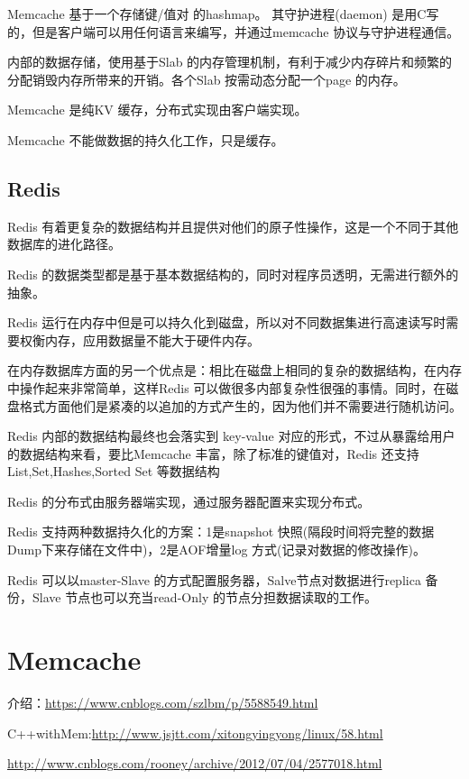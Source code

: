 \documentclass[UTF8,a4paper,12pt]{ctexbook}
\begin{document}
			Memcache 基于一个存储键/值对 的hashmap。 其守护进程(daemon) 是用C写的，但是客户端可以用任何语言来编写，并通过memcache 协议与守护进程通信。
			
			内部的数据存储，使用基于Slab 的内存管理机制，有利于减少内存碎片和频繁的分配销毁内存所带来的开销。各个Slab 按需动态分配一个page 的内存。
			 
			Memcache 是纯KV 缓存，分布式实现由客户端实现。
			
			Memcache 不能做数据的持久化工作，只是缓存。
		\subsection{Redis}
			Redis 有着更复杂的数据结构并且提供对他们的原子性操作，这是一个不同于其他数据库的进化路径。
			
			Redis 的数据类型都是基于基本数据结构的，同时对程序员透明，无需进行额外的抽象。
		
			Redis 运行在内存中但是可以持久化到磁盘，所以对不同数据集进行高速读写时需要权衡内存，应用数据量不能大于硬件内存。
			
			在内存数据库方面的另一个优点是：相比在磁盘上相同的复杂的数据结构，在内存中操作起来非常简单，这样Redis 可以做很多内部复杂性很强的事情。同时，在磁盘格式方面他们是紧凑的以追加的方式产生的，因为他们并不需要进行随机访问。
			
			Redis  内部的数据结构最终也会落实到 key-value 对应的形式，不过从暴露给用户的数据结构来看，要比Memcache 丰富，除了标准的键值对，Redis 还支持 List,Set,Hashes,Sorted Set 等数据结构
			
			Redis 的分布式由服务器端实现，通过服务器配置来实现分布式。
			
			Redis 支持两种数据持久化的方案：1是snapshot 快照(隔段时间将完整的数据Dump下来存储在文件中)，2是AOF增量log 方式(记录对数据的修改操作)。
			
			Redis 可以以master-Slave 的方式配置服务器，Salve节点对数据进行replica 备份，Slave 节点也可以充当read-Only 的节点分担数据读取的工作。

	\section{Memcache}
	
		介绍：\url{https://www.cnblogs.com/szlbm/p/5588549.html}
		
		C++withMem:\url{http://www.jsjtt.com/xitongyingyong/linux/58.html}
		
		\url{http://www.cnblogs.com/rooney/archive/2012/07/04/2577018.html}
	
\end{document}
